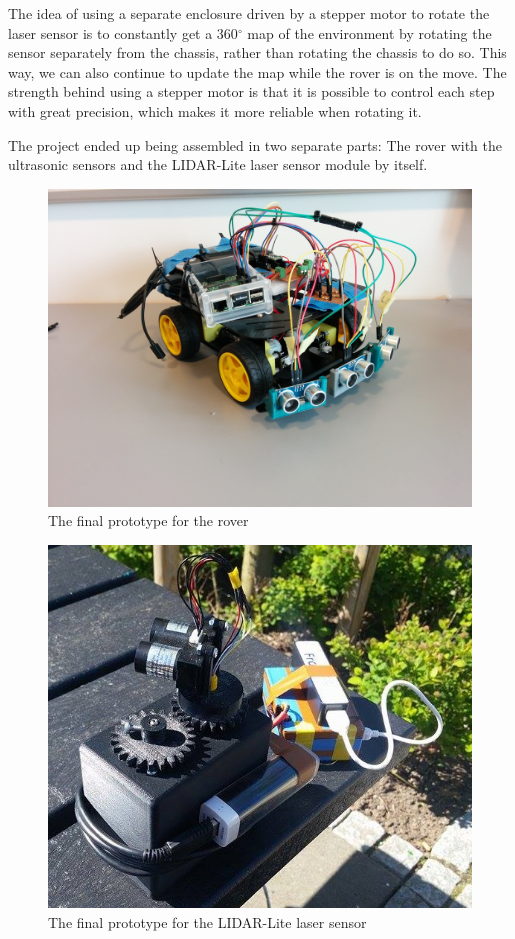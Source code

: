 The idea of using a separate enclosure driven by a stepper motor to rotate the laser sensor is to constantly get a 360$^\circ$ map of the environment by rotating the sensor separately from the chassis, rather than rotating the chassis to do so. This way, we can also continue to update the map while the rover is on the move. The strength behind using a stepper motor is that it is possible to control each step with great precision, which makes it more reliable when rotating it.

The project ended up being assembled in two separate parts: The rover with the ultrasonic sensors and the LIDAR-Lite laser sensor module by itself.

\begin{figure}[H]
	\centering
	\includegraphics[width=.6\linewidth]{images/build_ultrasonic.jpg}
	\caption{The final prototype for the rover}
	\label{rover_prototype_pic}
\end{figure}

\begin{figure}[H]
	\centering
	\includegraphics[width=.6\linewidth]{images/lidarpi.jpg}
	\caption{The final prototype for the LIDAR-Lite laser sensor}
	\label{lidar_prototype_pic}
\end{figure}